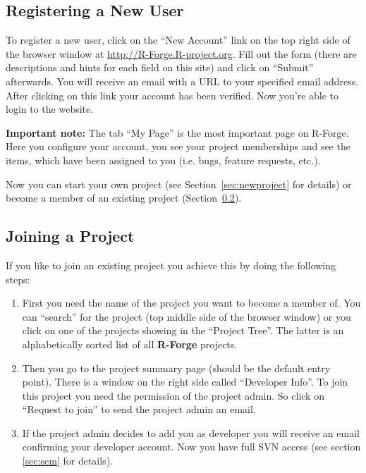\documentclass[a4paper]{article}
\begin{document}
\subsection{Registering a  New User}

To register a new user, click on the ``New Account'' link on the top
right side of the browser window at \url{http://R-Forge.R-project.org}.
Fill out the form (there are descriptions and hints for each field on
this site) and click on ``Submit'' afterwards. You will receive an
email with
a URL to your specified email address. After clicking on this link
your account has been verified. Now you're able to login to the
website.
\newline

\textbf{Important note:} The tab ``My Page'' is the most important
page on R-Forge. Here you configure your account, you see your
project memberships and see the items, which have been assigned to you
(i.e. bugs, feature requests, etc.).
\newline

Now you can start your own project (see Section~\ref{sec:newproject}
for details) or become a member of an existing project
(Section~\ref{sec:joinproject}). 

\subsection{Joining a Project}
\label{sec:joinproject}
If you like to join an existing project you achieve this by doing the
following steps:
\begin{enumerate}
\item First you need the name of the project you want to become a
  member of. You can ``search'' for the project (top middle side of the
  browser window) or you click on one of the projects showing in the
  ``Project Tree''. The latter is an alphabetically sorted list of all
  \textbf{R-Forge} projects.
\item Then you go to the project summary page (should be the default
  entry point). There is a window on the right side called
  ``Developer Info''. To join this project you need the permission of
  the project admin. So click on ``Request to join'' to send the
  project admin an email.
\item If the project admin decides to add you as developer you will
  receive an email confirming your developer account. Now you have
  full SVN access (see section \ref{sec:scm} for details).
\end{enumerate}
\end{document}
